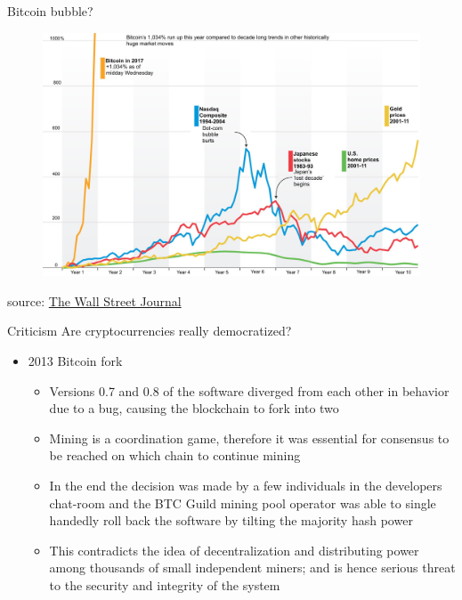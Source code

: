 \documentclass[10pt]{beamer}
\begin{document}

\begin{frame}{Bitcoin bubble?}
	\begin{figure}[]
		\centering
		\includegraphics  [width=4.in]{Images/bubble1}
	\end{figure}
	\begin{scriptsize}
		source: \href{https://www.wsj.com/articles/bitcoin-hits-10-000-as-sharp-rise-drowns-out-skeptics-1511919295}{The Wall Street Journal}
	\end{scriptsize}
\end{frame}


\begin{frame}{Criticism}
	Are cryptocurrencies really democratized? \vspace{5mm}
	\begin{itemize}
		\item 2013 Bitcoin fork
		\begin{itemize}
			\item Versions 0.7 and 0.8 of the software diverged from each other in behavior due to a bug, causing the blockchain to fork into two
			\item Mining is a coordination game, therefore it was essential for consensus to be reached on which chain to continue mining
			\item In the end the decision was made by a few individuals in the developers chat-room and the BTC Guild mining pool operator was able to single handedly roll back the software by tilting the majority hash power
			\item This contradicts the idea of decentralization and distributing power among thousands of small independent miners; and is hence serious threat to the security and integrity of the system
		\end{itemize}
	\end{itemize}
\end{frame}
\end{document}
